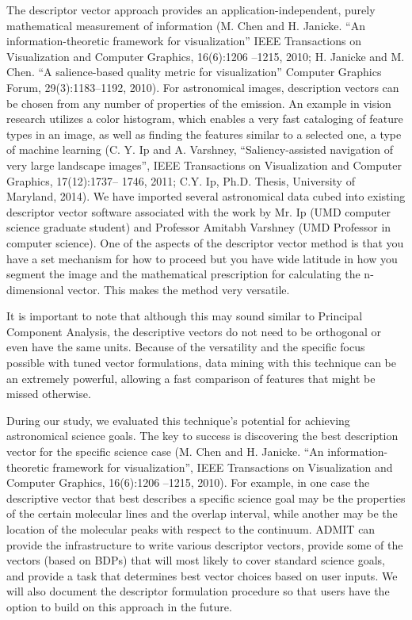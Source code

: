 The descriptor vector approach
provides an application-independent, purely mathematical measurement of information 
(M. Chen and H. Janicke. ``An information-theoretic framework for visualization''
IEEE Transactions on Visualization and Computer Graphics, 16(6):1206 –1215, 2010;
H. Janicke and M. Chen. ``A salience-based quality metric for visualization''
Computer Graphics Forum, 29(3):1183–1192, 2010).  
For astronomical images, description vectors can be chosen from any number of 
properties of the emission.  An example in vision research utilizes a color 
histogram, which enables a very fast cataloging of feature types in an image, 
as well as finding the features similar to a selected one, a type of machine learning 
(C. Y. Ip and A. Varshney, ``Saliency-assisted navigation of very large landscape 
images'', IEEE Transactions on Visualization and Computer Graphics, 17(12):1737– 1746, 2011;
C.Y. Ip, Ph.D. Thesis, University of Maryland, 2014).
We have imported several astronomical data cubed into existing descriptor vector
software associated with the work by Mr. Ip (UMD computer science graduate student)
and Professor Amitabh Varshney (UMD Professor in computer science).  One of the
aspects of the descriptor vector method is that you have a set mechanism for
how to proceed but you have wide latitude in how you segment the image and the
mathematical prescription for calculating the n-dimensional vector. This makes
the method very versatile.

It is important to note that
although this may sound similar to Principal Component Analysis, the descriptive 
vectors do not need to be orthogonal or even have the same units. Because of the
versatility and the specific focus possible with tuned vector formulations,
data mining with this technique can be an extremely powerful, allowing a 
fast comparison of features that might be missed otherwise.  

During our study, we evaluated this technique’s 
potential for achieving astronomical science goals.  The key to success is discovering the best 
description vector for the specific science case (M. Chen and H. Janicke. ``An 
information-theoretic framework for visualization'', IEEE Transactions on Visualization 
and Computer Graphics, 16(6):1206 –1215, 2010).   For example, in one case 
the descriptive vector that best describes a specific science goal may be the properties 
of the certain molecular lines and the overlap interval, while another may be the 
location of the molecular peaks with respect to the continuum.  ADMIT can provide the 
infrastructure to write various descriptor vectors, provide some of the vectors 
(based on BDPs) that will most likely to cover standard science goals, and provide a 
task that determines best vector choices based on user inputs.   
We will also document the descriptor formulation procedure so that users have the 
option to build on this approach in the future.   

